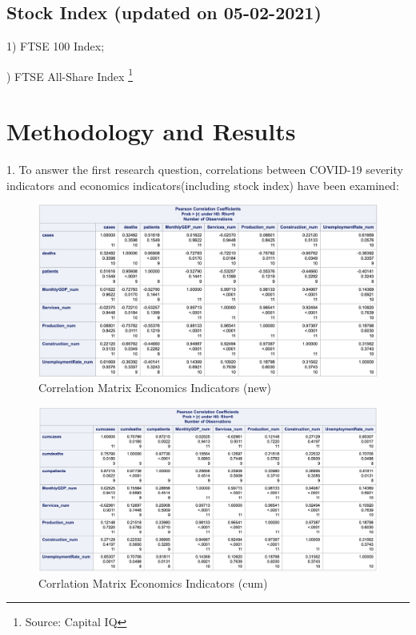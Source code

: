 \documentclass[12pt, a4paper]{report}
\begin{document}
\subsection{Stock Index (updated on 05-02-2021)}
1) FTSE 100 Index;\par
{}) FTSE All-Share Index
\footnote[6]{Source: Capital IQ}


\section{Methodology and Results}
1. To answer the first research question, correlations between COVID-19 severity indicators
and economics indicators(including stock index) have been examined:

\begin{figure}[H]
\centering
\includegraphics[width=15cm]{corr_economics_new.jpg}
\caption{Correlation Matrix Economics Indicators (new)}
\label{Fig1. Corrlation Matrix 1}
\end{figure}

\begin{figure}[H]
\centering
\includegraphics[width=15cm]{corr_economics_cum.jpg}
\caption{Corrlation Matrix Economics Indicators (cum)}
\label{Fig2. Corrlation Matrix 1}
\end{figure}
\end{document}
